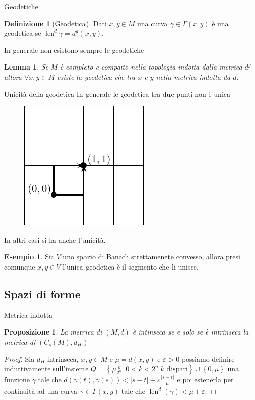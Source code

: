 \documentclass{beamer}
\newcounter{counter1}
\theoremstyle{plain}
\newtheorem{mylem}[counter1]{Lemma}
\newtheorem{mypro}[counter1]{Proposizione}
\theoremstyle{definition}
\newtheorem{mydef}[counter1]{Definizione}
\newtheorem{myes}[counter1]{Esempio}
\theoremstyle{remark}
\newcommand{\set}[1]{\left\{#1\right\}}
\newcommand{\pa}[1]{\left(#1\right)}
\newcommand{\abs}[1]{\left|#1\right|}
\DeclareMathOperator{\len}{len}
\begin{document}
\begin{frame}{Geodetiche}
  \begin{mydef}[Geodetica]
    Dati $x,y \in M$ una curva $\gamma \in \Gamma\pa{x,y}$ è una
    geodetica se $\len ^d \gamma = d^g(x,y)$.
  \end{mydef}

  In generale non esistono sempre le geodetiche
  \begin{mylem}
    Se $M$ \`e completo e compatto nella topologia indotta dalla
    metrica $d^g$ allora $\forall x,y \in M$ esiste la geodetica che tra
    $x$ e $y$ nella metrica indotta da $d$.
  \end{mylem}
\end{frame}

\begin{frame}{Unicità della geodetica}
  In generale le geodetica tra due punti non è unica
  \begin{figure}[h]
    \includegraphics[scale=0.4]{griglia.pdf}
  \end{figure}
  In altri casi si ha anche l'unicità.
  \begin{myes}
    Sia $V$ uno spazio di Banach strettamenete convesso, allora presi
    comunque $x,y \in V$ l'unica geodetica è il segmento che li unisce.
  \end{myes}
\end{frame}

\subsection{Spazi di forme}

\begin{frame}{Metrica indotta}
  \begin{mypro}
    La metrica di $(M,d)$ è intinseca se e solo se è intrinseca la
    metrica di $(C_s(M),d_H)$
  \end{mypro}
  \begin{proof}
    Sia $d_H$ intrinseca, $x,y\in M$ e $\mu = d(x,y)$ e $\varepsilon
    >0$ possiamo definire induttivamente sull'insieme $Q = \set{ \mu
      \frac{k}{2^n}|\; 0< k <2^n\; k\text{ dispari}} \cup \set{0,\mu}$
    una funzione $\tilde \gamma$ tale che $d(\tilde \gamma(t), \tilde
    \gamma(s)) < \abs{s -t} + \varepsilon \frac{ \abs{ s-t}} {\mu}$ e
    poi estenerla per continuità ad una curva $\gamma \in \Gamma(x,y)$
    tale che $\len ^d (\gamma) < \mu + \varepsilon$.
  \end{proof}
\end{frame}
\end{document}
